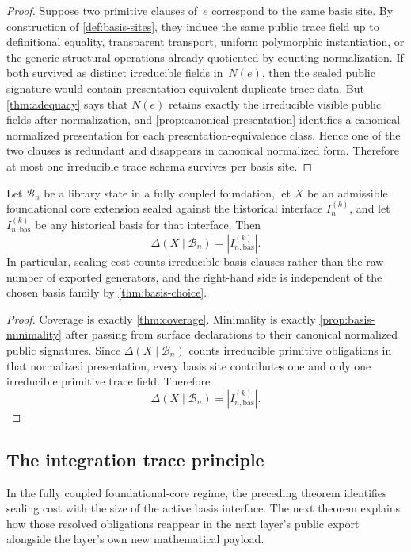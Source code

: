 \documentclass{lmcs}
\newcommand{\B}{\mathcal{B}}
\begin{document}
\begin{proof}
Suppose two primitive clauses of~$e$ correspond to the same basis site. By construction of \autoref{def:basis-sites}, they induce the same public trace field up to definitional equality, transparent transport, uniform polymorphic instantiation, or the generic structural operations already quotiented by counting normalization. If both survived as distinct irreducible fields in~$N(e)$, then the sealed public signature would contain presentation-equivalent duplicate trace data. But \autoref{thm:adequacy} says that $N(e)$ retains exactly the irreducible visible public fields after normalization, and \autoref{prop:canonical-presentation} identifies a canonical normalized presentation for each presentation-equivalence class. Hence one of the two clauses is redundant and disappears in canonical normalized form. Therefore at most one irreducible trace schema survives per basis site.
\end{proof}

\begin{thm}
\label{thm:canonicity}
Let $\B_n$ be a library state in a fully coupled foundation, let $X$ be an
admissible foundational core extension sealed against the historical interface
$I_n^{(k)}$, and let $I_{n,\mathrm{bas}}^{(k)}$ be any historical basis for
that interface. Then
\[
  \Delta(X \mid \B_n) = |I_{n,\mathrm{bas}}^{(k)}|.
\]
\noindent
In particular, sealing cost counts irreducible basis clauses rather than the
raw number of exported generators, and the right-hand side is independent of
the chosen basis family by \autoref{thm:basis-choice}.
\end{thm}

\begin{proof}
Coverage is exactly \autoref{thm:coverage}. Minimality is exactly \autoref{prop:basis-minimality} after passing from surface declarations to their canonical normalized public signatures. Since $\Delta(X \mid \B_n)$ counts irreducible primitive obligations in that normalized presentation, every basis site contributes one and only one irreducible primitive trace field. Therefore
\[
  \Delta(X \mid \B_n) = |I_{n,\mathrm{bas}}^{(k)}|.
\]
\end{proof}

\subsection{The integration trace principle}

In the fully coupled foundational-core regime, the preceding theorem identifies sealing cost with the size of the active basis interface. The next theorem explains how those resolved obligations reappear in the next layer's public export alongside the layer's own new mathematical payload.
\end{document}
